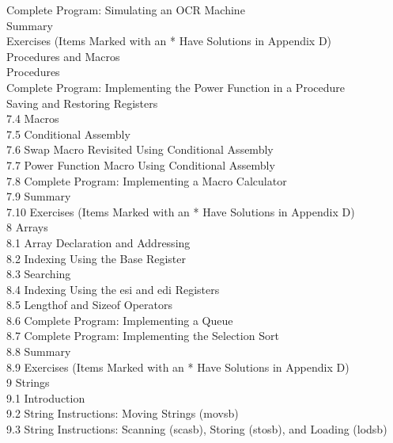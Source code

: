 \documentclass[10pt]{book}
\begin{document}
 Complete Program: Simulating an OCR Machine \\
 Summary \\
 Exercises (Items Marked with an * Have Solutions in Appendix D) \\
 Procedures and Macros \\
 Procedures \\
 Complete Program: Implementing the Power Function in a Procedure \\
 Saving and Restoring Registers \\
7.4 Macros \\
7.5 Conditional Assembly \\
7.6 Swap Macro Revisited Using Conditional Assembly \\
7.7 Power Function Macro Using Conditional Assembly \\
7.8 Complete Program: Implementing a Macro Calculator \\
7.9 Summary \\
7.10 Exercises (Items Marked with an * Have Solutions in Appendix D) \\
8 Arrays \\
8.1 Array Declaration and Addressing \\
8.2 Indexing Using the Base Register \\
8.3 Searching \\
8.4 Indexing Using the esi and edi Registers \\
8.5 Lengthof and Sizeof Operators \\
8.6 Complete Program: Implementing a Queue \\
8.7 Complete Program: Implementing the Selection Sort \\
8.8 Summary \\
8.9 Exercises (Items Marked with an * Have Solutions in Appendix D) \\
9 Strings \\
9.1 Introduction \\
9.2 String Instructions: Moving Strings (movsb) \\
9.3 String Instructions: Scanning (scasb), Storing (stosb), and Loading (lodsb) \\
\end{document}
